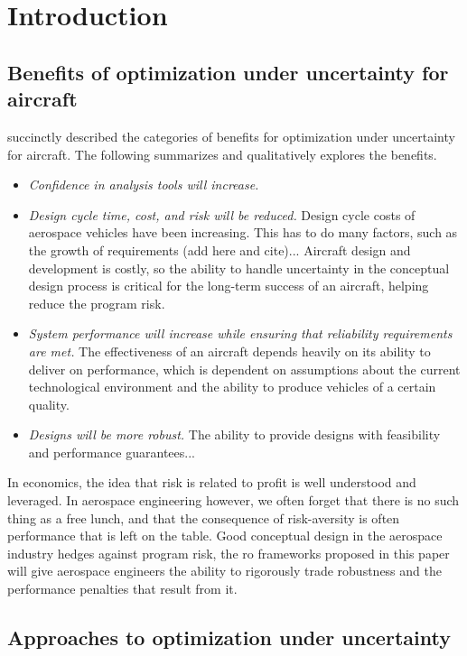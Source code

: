 \section{Introduction}

\subsection{Benefits of optimization under uncertainty for aircraft}


\cite{Zang2002} succinctly described the categories of benefits for optimization under uncertainty for aircraft.
The following summarizes and qualitatively explores the benefits.
\begin{itemize}
    \item \textit{Confidence in analysis tools will increase.}
    \item \textit{Design cycle time, cost, and risk will be reduced.}
    Design cycle costs of aerospace vehicles have been increasing. This has to do
    many factors, such as the growth of requirements (add here and cite)...
    Aircraft design and development is costly, so the ability to handle uncertainty in
    the conceptual design process is critical for the long-term success of an aircraft,
    helping reduce the program risk.
    \item \textit{System performance will increase while ensuring that reliability requirements
                  are met. }
    The effectiveness of an aircraft depends heavily on its
    ability to deliver on performance, which is dependent on assumptions about the
    current technological environment and the ability to produce vehicles of a certain quality.
    \item \textit{Designs will be more robust.}
    The ability to provide designs with feasibility and performance guarantees...
\end{itemize}

In economics, the idea that risk is related to profit is well understood and leveraged.
In aerospace engineering however, we often forget that there is no such thing as a free lunch,
and that the consequence of risk-aversity is often performance that is left on the table.
Good conceptual design in the aerospace industry hedges against program risk,
the \gls{ro} frameworks proposed in this paper will
give aerospace engineers the ability to rigorously trade robustness and the performance penalties
that result from it.

\subsection{Approaches to optimization under uncertainty}

